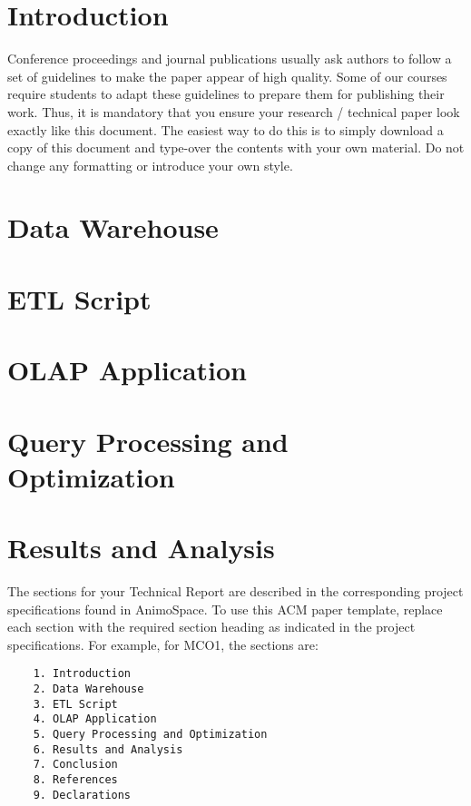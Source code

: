 \documentclass[sigconf, pbalance]{acmart}
\begin{document}
\section{Introduction}

Conference proceedings and journal publications usually ask authors to follow a set of guidelines to make the paper appear of high quality. Some of our courses require students to adapt these guidelines to prepare them for publishing their work. Thus, it is mandatory that you ensure your research / technical paper look exactly like this document. The easiest way to do this is to simply download a copy of this document and type-over the contents with your own material. Do not change any formatting or introduce your own style.


\section{Data Warehouse}

\section{ETL Script}

\section{OLAP Application}

\section{Query Processing and Optimization}

\section{Results and Analysis}

The sections for your Technical Report are described in the corresponding project specifications found in AnimoSpace. 
To use this ACM paper template, replace each section with the required section heading as indicated in the project specifications. For example, for MCO1, the sections are:
\begin{verbatim}
    1. Introduction
    2. Data Warehouse
    3. ETL Script
    4. OLAP Application
    5. Query Processing and Optimization
    6. Results and Analysis
    7. Conclusion
    8. References
    9. Declarations
\end{verbatim}
\end{document}
